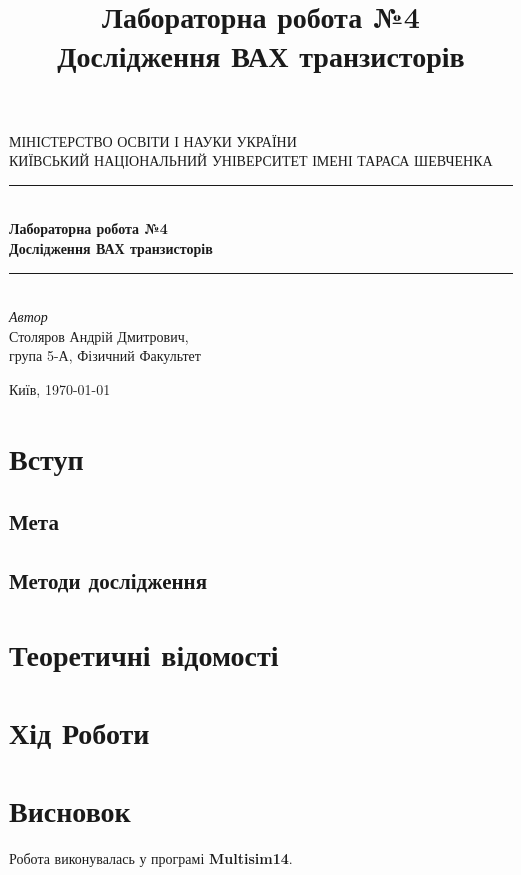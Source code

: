 \documentclass[
  ukrainian,
  14pt
]{extreport}
\author{}
\title{\Huge Лабораторна робота №4 \\\Large Дослідження ВАХ транзисторів}
\date{}
\begin{document}
\begin{titlepage} 
	\newcommand{\HRule}{\rule{\linewidth}{0.5mm}} 
	
	\center 
	
	\textsc{\Large МІНІСТЕРСТВО ОСВІТИ І НАУКИ УКРАЇНИ\\ \Large КИЇВСЬКИЙ НАЦІОНАЛЬНИЙ УНІВЕРСИТЕТ ІМЕНІ ТАРАСА ШЕВЧЕНКА}\\[1.5cm] 

	
	\HRule\\[0.4cm]
	
	{\huge \bfseries  Лабораторна робота №4 \\\Large \bfseries Дослідження ВАХ транзисторів
    }\\[0.4cm]
	
	\HRule\\[1.5cm]

	
	

	{\large\textit{Автор}}\\
	\large Столяров Андрій Дмитрович, \\\large група 5-А, Фізичний Факультет 
	
	
	\vfill\vfill\vfill 
	\vfill
	{\normalsize Київ, \today} 
\end{titlepage}
\tableofcontents
\clearpage
\section{Вступ}

\subsection{Мета}

\subsection{Методи дослідження}

\section{Теоретичні відомості}

\section{Хід Роботи}

\section{Висновок}


Робота виконувалась у програмі \textbf{Multisim14}.
\end{document}
